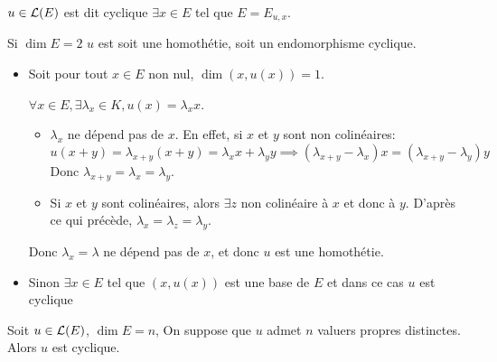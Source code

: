 \begin{definition}
	$u \in \mathcal{L}(E)$ est dit cyclique \ssi $\exists x \in E$ tel que $E = E_{u,x}$.
\end{definition}

\begin{example}
	Si $\dim E = 2$ $u$ est soit une homothétie, soit un endomorphisme cyclique.

	\begin{itemize}
		\item Soit pour tout $x \in E$ non nul, $\dim (x, u(x)) = 1$.

		      $\forall x \in E, \exists \lambda_x \in K, u(x) = \lambda_x x$.

		      \begin{itemize}
			      \item $\lambda_x$ ne dépend pas de $x$. En effet, si $x$ et $y$ sont non colinéaires:
			            $$ u (x+y) = \lambda_{x+y} (x+y) = \lambda_x x + \lambda_y y \implies (\lambda_{x+y} - \lambda_x) x = (\lambda_{x+y} - \lambda_y) y$$
			            Donc $\lambda_{x+y} = \lambda_x = \lambda_y$.

			      \item Si $x$ et $y$ sont colinéaires, alors $\exists z$ non colinéaire à $x$ et donc à $y$. D'après ce qui précède, $\lambda_x = \lambda_z = \lambda_y$.
		      \end{itemize}

		      Donc $\lambda_x = \lambda$ ne dépend pas de $x$, et donc $u$ est une homothétie.

		\item Sinon $\exists x \in E$ tel que $(x, u(x))$ est une base de $E$ et dans ce cas $u$ est cyclique
	\end{itemize}
\end{example}

\begin{example}
	Soit $u \in \mathcal{L}(E)$, $\dim E = n$, On suppose que $u$ admet $n$ valuers propres distinctes. Alors $u$ est cyclique.
\end{example}
